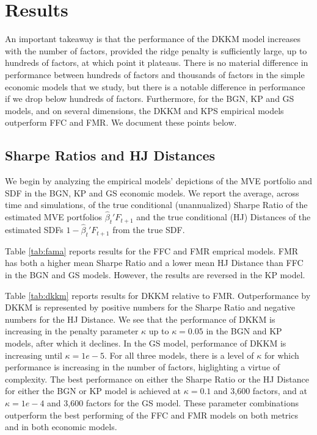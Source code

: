 \documentclass[12pt]{scrarticle}
\begin{document}
\section{Results}\label{sec:results}

An important takeaway is that the performance of the DKKM model increases with the number of factors, provided the ridge penalty is sufficiently large, up to hundreds of factors, at which point it plateaus.  There is no material difference in performance between hundreds of factors and thousands of factors in the simple economic models that we study, but there is a notable difference in performance if we drop below hundreds of factors.  Furthermore, for the BGN, KP and GS models, and on several dimensions, the DKKM and KPS empirical models outperform FFC and FMR.  We document these points below.


\subsection{Sharpe Ratios and HJ Distances} 

We begin by analyzing the empirical models' depictions of the MVE portfolio and SDF in the BGN, KP and GS economic models. We report the average, across time and simulations, of the true conditional (unannualized) Sharpe Ratio of the estimated MVE portfolios $\hat \beta_t' F_{t+1}$ and the true conditional \citet{hj} (HJ) Distances of the  estimated SDFs $1-\hat \beta_t'F_{t+1}$ from the true SDF. 

Table \ref{tab:fama} reports results for the FFC and FMR emprical models.  FMR has both a higher mean Sharpe Ratio and a lower mean HJ Distance than FFC in the BGN and GS models.  However, the results are reversed in the KP model.

Table \ref{tab:dkkm} reports results for DKKM relative to FMR.  Outperformance by DKKM is represented by positive numbers for the Sharpe Ratio and negative numbers for the HJ Distance.  We see that the performance of DKKM is increasing in the penalty parameter $\kappa$ up to $\kappa=0.05$ in the BGN and KP models, after which it declines.  In the GS model, performance of DKKM is increasing until $\kappa = 1e-5.$ For all three models, there is a level of $\kappa$ for which performance is increasing in the number of factors, higlighting a virtue of complexity.  The best performance on either the Sharpe Ratio or the HJ Distance for either the BGN or KP model is achieved at $\kappa=0.1$ and 3,600 factors, and at $\kappa = 1e-4$ and 3,600 factors for the GS model.  These parameter combinations outperform the best performing of the FFC and FMR models on both metrics and in both economic models.  
\end{document}
